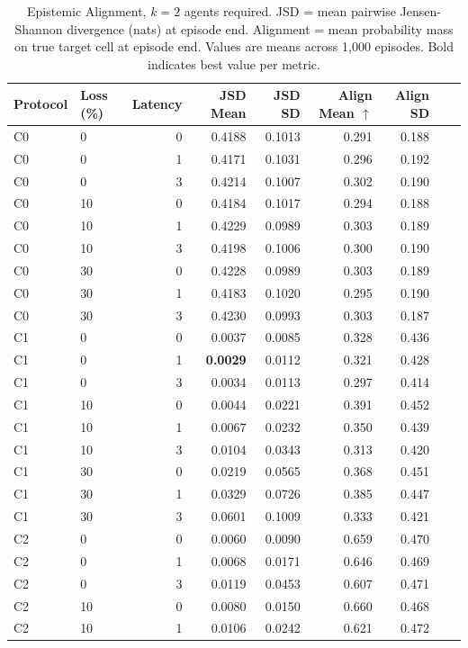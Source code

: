 \documentclass[pdflatex,sn-mathphys-num]{sn-jnl}%
\theoremstyle{thmstyleone}%
\theoremstyle{thmstyletwo}%
\theoremstyle{thmstylethree}%
\begin{document}
\begin{appendices}
\begin{table}
\centering
\caption{Epistemic Alignment, $k=2$ agents required. JSD = mean pairwise Jensen-Shannon divergence (nats) at episode end. Alignment = mean probability mass on true target cell at episode end. Values are means across 1,000 episodes. Bold indicates best value per metric.}
\label{tab:appendix_epistemic_a}
\small
\begin{tabular}{llrrrrrrr}
\toprule
Protocol & Loss (\%) & Latency & JSD Mean & JSD SD & Align Mean $\uparrow$ & Align SD \\
\midrule
C0 & 0 & 0 & 0.4188 & 0.1013 & 0.291 & 0.188 \\
C0 & 0 & 1 & 0.4171 & 0.1031 & 0.296 & 0.192 \\
C0 & 0 & 3 & 0.4214 & 0.1007 & 0.302 & 0.190 \\
C0 & 10 & 0 & 0.4184 & 0.1017 & 0.294 & 0.188 \\
C0 & 10 & 1 & 0.4229 & 0.0989 & 0.303 & 0.189 \\
C0 & 10 & 3 & 0.4198 & 0.1006 & 0.300 & 0.190 \\
C0 & 30 & 0 & 0.4228 & 0.0989 & 0.303 & 0.189 \\
C0 & 30 & 1 & 0.4183 & 0.1020 & 0.295 & 0.190 \\
C0 & 30 & 3 & 0.4230 & 0.0993 & 0.303 & 0.187 \\
\addlinespace[4pt]
C1 & 0 & 0 & 0.0037 & 0.0085 & 0.328 & 0.436 \\
C1 & 0 & 1 & \textbf{0.0029} & 0.0112 & 0.321 & 0.428 \\
C1 & 0 & 3 & 0.0034 & 0.0113 & 0.297 & 0.414 \\
C1 & 10 & 0 & 0.0044 & 0.0221 & 0.391 & 0.452 \\
C1 & 10 & 1 & 0.0067 & 0.0232 & 0.350 & 0.439 \\
C1 & 10 & 3 & 0.0104 & 0.0343 & 0.313 & 0.420 \\
C1 & 30 & 0 & 0.0219 & 0.0565 & 0.368 & 0.451 \\
C1 & 30 & 1 & 0.0329 & 0.0726 & 0.385 & 0.447 \\
C1 & 30 & 3 & 0.0601 & 0.1009 & 0.333 & 0.421 \\
\addlinespace[4pt]
C2 & 0 & 0 & 0.0060 & 0.0090 & 0.659 & 0.470 \\
C2 & 0 & 1 & 0.0068 & 0.0171 & 0.646 & 0.469 \\
C2 & 0 & 3 & 0.0119 & 0.0453 & 0.607 & 0.471 \\
C2 & 10 & 0 & 0.0080 & 0.0150 & 0.660 & 0.468 \\
C2 & 10 & 1 & 0.0106 & 0.0242 & 0.621 & 0.472 \\

\end{tabular}
\end{table}
\end{appendices}
\end{document}
